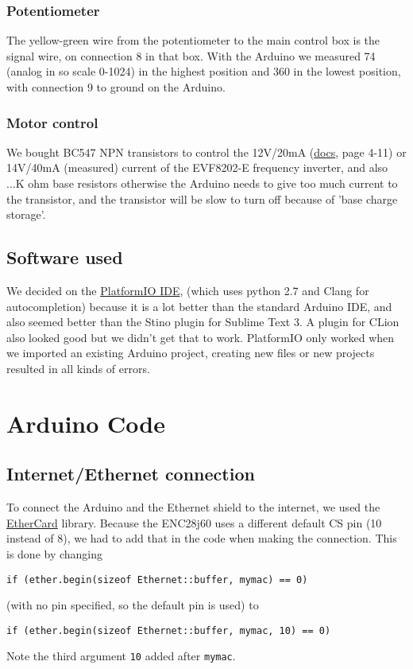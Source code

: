 \documentclass{article}
\begin{document}
		\subsubsection{Potentiometer}
		The yellow-green wire from the potentiometer to the main control box is the signal wire, on connection 8 in that box. With the Arduino we measured 74 (analog in so scale 0-1024) in the highest position and 360 in the lowest position, with connection 9 to ground on the Arduino.
		\subsubsection{Motor control}
		We bought BC547 NPN transistors to control the 12V/20mA (\href{http://download.lenze.com/TD/8201-8204__Inverter__v02-08__EN.pdf }{docs}, page 4-11) or 14V/40mA (measured) current of the EVF8202-E frequency inverter, and also ...K ohm base resistors otherwise the Arduino needs to give too much current to the transistor, and the transistor will be slow to turn off because of 'base charge storage'.
	
		\subsection{Software used}
		We decided on the \href{http://platformio.org/platformio-ide}{PlatformIO IDE}, (which uses python 2.7 and Clang for autocompletion) because it is a lot better than the standard Arduino IDE, and also seemed better than the Stino plugin for Sublime Text 3. A plugin for CLion also looked good but we didn't get that to work. PlatformIO only worked when we imported an existing Arduino project, creating new files or new projects resulted in all kinds of errors.
	
	\section{Arduino Code}
		\subsection{Internet/Ethernet connection}
			To connect the Arduino and the Ethernet shield to the internet, we used the \href{https://github.com/jcw/ethercard}{EtherCard} library. Because the ENC28j60 uses a different default CS pin (10 instead of 8), we had to add that in the code when making the connection. This is done by changing
			\begin{lstlisting}
if (ether.begin(sizeof Ethernet::buffer, mymac) == 0)
			\end{lstlisting}
			(with no pin specified, so the default pin is used) to
			\begin{lstlisting}
if (ether.begin(sizeof Ethernet::buffer, mymac, 10) == 0)
			\end{lstlisting}
			Note the third argument \lstinline|10| added after \lstinline|mymac|.
\end{document}
